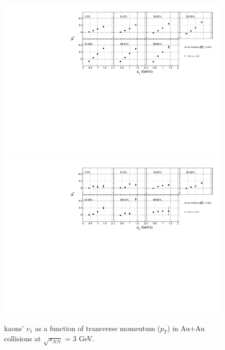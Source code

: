 \begin{figure}[h]
\includegraphics[scale=0.5]{chapter3/fig/v1ptpikp/v1pt_cent_kaonp.pdf}
\includegraphics[scale=0.5]{chapter3/fig/v1ptpikp/v1pt_cent_kaonm.pdf}
\caption{kaons' $v_{1}$ as a function of transverse momentum ($p_{T}$) in Au+Au collisions at $\sqrt{s_{NN}}$ = 3 GeV.}
\label{kaon_v1pt_cent}
\end{figure}

